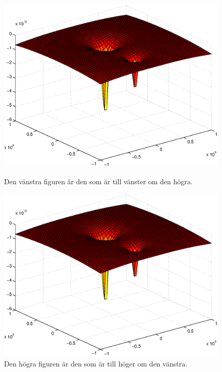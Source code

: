 \begin{figure}[!htb]
  \begin{minipage}[htb]{0.48\linewidth}
    \begin{center}
      \includegraphics[scale=.35]{images/surf.eps}
    \end{center}
    \caption[Den vänstra figuren.]{Den vänstra figuren är den som är
      till vänster om den högra.}
\label{fig:leftfig}
  \end{minipage}\hfill
  \begin{minipage}[htb]{0.48\linewidth}
    \begin{center}
      \includegraphics[scale=.35]{images/surf.eps}
    \end{center}
    \caption[Den högra figuren.]{Den högra figuren är den som är
      till höger om den vänstra.}
\label{fig:rightfig}
  \end{minipage}
\end{figure}

